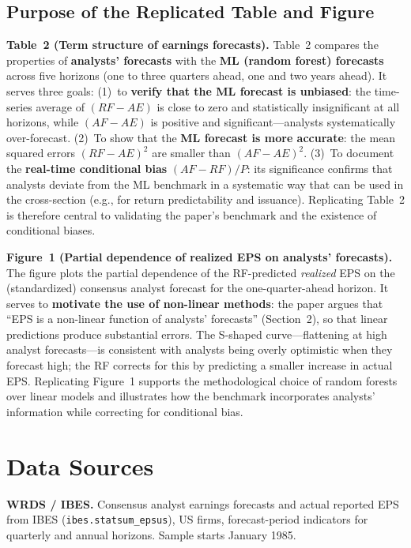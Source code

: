 \documentclass[11pt]{article}
\begin{document}
\subsection{Purpose of the Replicated Table and Figure}

\textbf{Table~2 (Term structure of earnings forecasts).} Table~2 compares the properties of \textbf{analysts' forecasts} with the \textbf{ML (random forest) forecasts} across five horizons (one to three quarters ahead, one and two years ahead). It serves three goals: (1)~to \textbf{verify that the ML forecast is unbiased}: the time-series average of $(RF - AE)$ is close to zero and statistically insignificant at all horizons, while $(AF - AE)$ is positive and significant---analysts systematically over-forecast. (2)~To show that the \textbf{ML forecast is more accurate}: the mean squared errors $(RF-AE)^2$ are smaller than $(AF-AE)^2$. (3)~To document the \textbf{real-time conditional bias} $(AF-RF)/P$: its significance confirms that analysts deviate from the ML benchmark in a systematic way that can be used in the cross-section (e.g., for return predictability and issuance). Replicating Table~2 is therefore central to validating the paper's benchmark and the existence of conditional biases.

\textbf{Figure~1 (Partial dependence of realized EPS on analysts' forecasts).} The figure plots the partial dependence of the RF-predicted \emph{realized} EPS on the (standardized) consensus analyst forecast for the one-quarter-ahead horizon. It serves to \textbf{motivate the use of non-linear methods}: the paper argues that ``EPS is a non-linear function of analysts' forecasts'' (Section~2), so that linear predictions produce substantial errors. The S-shaped curve---flattening at high analyst forecasts---is consistent with analysts being overly optimistic when they forecast high; the RF corrects for this by predicting a smaller increase in actual EPS. Replicating Figure~1 supports the methodological choice of random forests over linear models and illustrates how the benchmark incorporates analysts' information while correcting for conditional bias.

\section{Data Sources}

\textbf{WRDS / IBES.} Consensus analyst earnings forecasts and actual reported EPS from IBES (\texttt{ibes.statsum\_epsus}), US firms, forecast-period indicators for quarterly and annual horizons. Sample starts January 1985.
\end{document}
